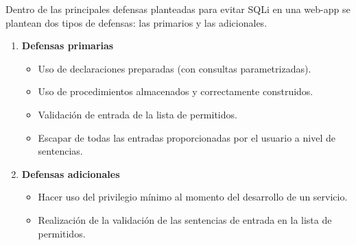 \documentclass[12pt,oneside,a4paper]{book}
\begin{document}
\begin{enumerate}
\begin{enumerate}
        \hspace{20pt}
        Dentro de las principales defensas planteadas para evitar SQLi en una web-app se plantean dos tipos de defensas: las primarios y las adicionales.

        \vspace{1em}
        
        \begin{enumerate}
            \begin{enumerate}
                \begin{enumerate}
                    \item{\textbf{Defensas primarias}}

                    \vspace{1em}
                        
                        \begin{itemize}
                            \item Uso de declaraciones preparadas (con consultas parametrizadas).
                            \item Uso de procedimientos almacenados y correctamente construidos.
                            \item Validación de entrada de la lista de permitidos.
                            \item Escapar de todas las entradas proporcionadas por el usuario a nivel de sentencias.
                        \end{itemize}
                        
                    \vspace{1em}

                    \item{\textbf{Defensas adicionales}}

                    \vspace{1em}
                        
                        \begin{itemize}
                            \item Hacer uso del privilegio mínimo al momento del desarrollo de un servicio.
                            \item Realización de la validación de las sentencias de entrada en la lista de permitidos.
                        \end{itemize}
                        
                    \vspace{1em}
                    

\end{enumerate}
\end{enumerate}
\end{enumerate}
\end{enumerate}
\end{enumerate}
\end{document}
